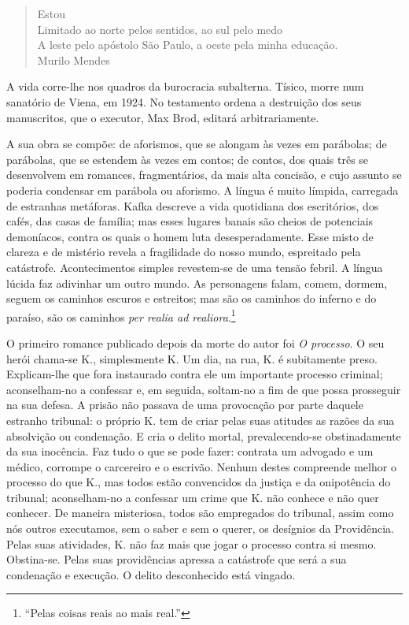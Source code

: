 \begin{verse}
Estou\\
Limitado ao norte pelos sentidos, ao sul pelo medo\\
A leste pelo apóstolo São Paulo, a oeste pela minha educação.\\
Murilo Mendes
\end{verse}

A vida corre-lhe nos quadros da burocracia subalterna.
Tísico, morre num sanatório de Viena, em 1924. No testamento ordena a destruição dos seus
manuscritos, que o executor, Max Brod, editará arbitrariamente.

A sua obra se compõe: de aforismos, que se alongam às vezes em parábolas; de parábolas, que se estendem às vezes em contos; de contos, dos quais três
se desenvolvem em romances, fragmentários, da mais alta concisão, e
cujo assunto se poderia condensar em parábola ou aforismo. A língua é
muito límpida, carregada de estranhas metáforas. Kafka descreve a vida
quotidiana dos escritórios, dos cafés, das casas de família; mas esses
lugares banais são cheios de potenciais demoníacos,
contra os quais o homem luta desesperadamente. Esse misto de clareza e
de mistério revela a fragilidade do nosso mundo, espreitado pela
catástrofe. Acontecimentos simples revestem-se de uma tensão febril. A língua lúcida faz
adivinhar um outro mundo. As personagens falam, comem, dormem, seguem os
caminhos escuros e estreitos; mas são os caminhos do inferno e do
paraíso, são os caminhos \textit{per realia ad realiora}.\footnote{``Pelas coisas reais ao mais real.''}

O primeiro romance publicado depois da morte do autor foi \textit{O processo}. O
seu herói chama-se K., simplesmente K. Um dia, na rua, K. é subitamente
preso. Explicam-lhe que fora instaurado contra ele um importante
processo criminal; aconselham-no a confessar e, em seguida, soltam-no
a fim de que possa prosseguir na sua defesa. A prisão não passava de uma
provocação por parte daquele estranho tribunal: o próprio K. tem de
criar pelas suas atitudes as razões da sua absolvição ou condenação. E
cria o delito mortal, prevalecendo-se obstinadamente da sua inocência.
Faz tudo o que se pode fazer: contrata um advogado e um médico, corrompe
o carcereiro e o escrivão. Nenhum destes compreende melhor o processo do
que K., mas todos estão convencidos da justiça e da onipotência do
tribunal; aconselham-no a confessar um crime que K. não conhece e não
quer conhecer. De maneira misteriosa, todos são empregados do tribunal, assim como nós outros
executamos, sem o saber e sem o querer, os desígnios da Providência. Pelas suas
atividades, K. não faz mais que jogar o processo contra si mesmo. Obstina-se.
Pelas suas providências apressa a catástrofe que será a sua condenação e
execução. O delito desconhecido está vingado.


